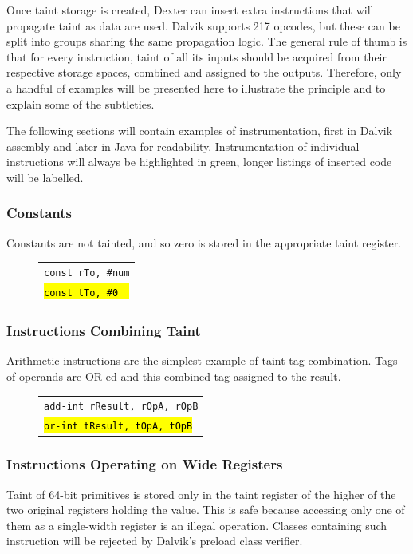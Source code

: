 \documentclass[12pt,twoside,notitlepage]{report}
\newcommand{\centerbox}[1] {
	\begin{center}
	\begin{footnotesize}
	\begin{tabular}{l}
		#1
	\end{tabular}
	\end{footnotesize}
	\end{center}
}
\newcommand{\asm}[1] {\texttt{#1}}
\newcommand{\asmExtra}[1] {\texttt{\hl{#1}}}
\begin{document}
Once taint storage is created, Dexter can insert extra instructions that will propagate taint as data are used. Dalvik supports 217 opcodes, but these can be split into groups sharing the same propagation logic. The general rule of thumb is that for every instruction, taint of all its inputs should be acquired from their respective storage spaces, combined and assigned to the outputs. Therefore, only a handful of examples will be presented here to illustrate the principle and to explain some of the subtleties.

The following sections will contain examples of instrumentation, first in Dalvik assembly and later in Java for readability. Instrumentation of individual instructions will always be highlighted in green, longer listings of inserted code will be labelled.

\subsubsection{Constants}

Constants are not tainted, and so zero is stored in the appropriate taint register.

	\begin{figure}[H]
		\centerbox{
			\asm{const rTo, \#num} \\
			\asmExtra{const tTo, \#0~~}
		}
	\end{figure}

\subsubsection{Instructions Combining Taint}

Arithmetic instructions are the simplest example of taint tag combination. Tags of operands are OR-ed and this combined tag assigned to the result.

	\begin{figure}[H]
		\centerbox{
			\asm{add-int rResult, rOpA, rOpB} \\
			\asmExtra{or-int tResult, tOpA, tOpB}
		}
	\end{figure}

\subsubsection{Instructions Operating on Wide Registers}

Taint of 64-bit primitives is stored only in the taint register of the higher of the two original registers holding the value. This is safe because accessing only one of them as a single-width register is an illegal operation. Classes containing such instruction will be rejected by Dalvik's preload class verifier.
\end{document}

